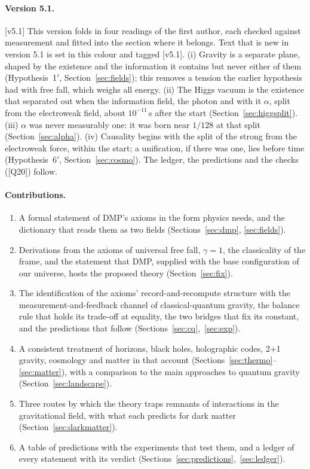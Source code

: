 \documentclass[11pt,a4paper]{article}
\theoremstyle{definition}
\theoremstyle{remark}
\newcommand{\chk}[1]{\textsf{[#1]}}
\newcommand{\vtag}{{\color{newc}\textsf{\scriptsize[v5.1]}}}
\newenvironment{vnew}{\color{newc}}{}
\theoremstyle{definition}
\begin{document}
\begin{vnew}
\paragraph{Version 5.1.}\vtag{} This version folds in four readings of the first author, each checked against measurement and fitted into
the section where it belongs. Text that is new in version 5.1 is set in this colour and tagged \vtag. (i) Gravity is a separate plane,
shaped by the existence and the information it contains but never either of them (Hypothesis~1$'$, Section~\ref{sec:fields}); this
removes a tension the earlier hypothesis had with free fall, which weighs all energy. (ii) The Higgs vacuum is the existence that separated
out when the information field, the photon and with it $\alpha$, split from the electroweak field, about $10^{-11}$\,s after the start
(Section~\ref{sec:higgsplit}). (iii) $\alpha$ was never measurably one: it was born near $1/128$ at that split (Section~\ref{sec:alpha}).
(iv) Causality begins with the split of the strong from the electroweak force, within the start; a unification, if there was one, lies
before time (Hypothesis~6$'$, Section~\ref{sec:cosmo}). The ledger, the predictions and the checks (\chk{Q20}) follow.
\end{vnew}

\paragraph{Contributions.}
\begin{enumerate}[nosep]
\item A formal statement of DMP's axioms in the form physics needs, and the dictionary that reads them as two fields (Sections~\ref{sec:dmp},
\ref{sec:fields}).
\item Derivations from the axioms of universal free fall, $\gamma=1$, the classicality of the frame, and the statement that DMP, supplied
with the base configuration of our universe, hosts the proposed theory (Section~\ref{sec:fix}).
\item The identification of the axioms' record-and-recompute structure with the measurement-and-feedback channel of classical-quantum
gravity, the balance rule that holds its trade-off at equality, the two bridges that fix its constant, and the predictions that follow
(Sections~\ref{sec:cq},~\ref{sec:exp}).
\item A consistent treatment of horizons, black holes, holographic codes, 2+1 gravity, cosmology and matter in that account
(Sections~\ref{sec:thermo}--\ref{sec:matter}), with a comparison to the main approaches to quantum gravity (Section~\ref{sec:landscape}).
\item Three routes by which the theory traps remnants of interactions in the gravitational field, with what each predicts for dark matter
(Section~\ref{sec:darkmatter}).
\item A table of predictions with the experiments that test them, and a ledger of every statement with its verdict
(Sections~\ref{sec:predictions},~\ref{sec:ledger}).
\end{enumerate}
\end{document}
